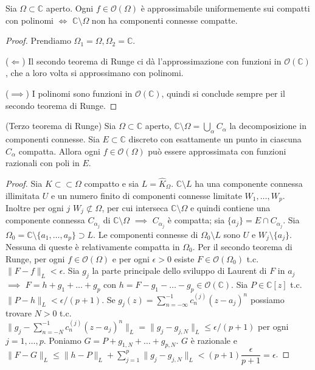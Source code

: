 \begin{cor}
  Sia $\Omega \subset \mathbb{C}$ aperto. Ogni $f \in \mathcal{O}(\Omega)$ è approssimabile uniformemente sui compatti con polinomi $\iff$ $\mathbb{C}\setminus \Omega$ non ha componenti connesse compatte.
\end{cor}

\begin{proof}
  Prendiamo $\Omega_1=\Omega, \Omega_2=\mathbb{C}$.

  ($\Leftarrow$) Il secondo teorema di Runge ci dà l'approssimazione con funzioni in $\mathcal{O}(\mathbb{C})$, che a loro volta si approssimano con polinomi.

  ($\implies$) I polinomi sono funzioni in $\mathcal{O}(\mathbb{C})$, quindi si conclude sempre per il secondo teorema di Runge.
\end{proof}

\begin{thm}
  (Terzo teorema di Runge) Sia $\Omega \subset \mathbb{C}$ aperto, $\displaystyle \mathbb{C}\setminus \Omega=\bigcup_{\alpha}C_{\alpha}$ la decomposizione in componenti connesse. Sia $E \subset \mathbb{C}$ discreto con esattamente un punto in ciascuna $C_{\alpha}$ compatta. Allora ogni $f \in \mathcal{O}(\Omega)$ può essere approssimata con funzioni razionali con poli in $E$.
\end{thm}

\begin{proof}
  Sia $K \subset \subset \Omega$ compatto e sia $L=\widehat{K}_{\Omega}$. $\mathbb{C}\setminus L$ ha una componente connessa illimitata $U$ e un numero finito di componenti connesse limitate $W_1, \dots, W_p$.
  Inoltre per ogni $j$ $W_j \not\subset \Omega$, per cui interseca $\mathbb{C}\setminus\Omega$ e quindi contiene una componente connessa $C_{\alpha_j}$ di $\mathbb{C}\setminus \Omega$ $\implies$ $C_{\alpha_j}$ è compatta; sia $\{a_j\}=E\cap C_{\alpha_j}$.
  Sia $\Omega_0=\mathbb{C}\setminus\{a_1, \dots, a_p\} \supset L$. Le componenti connesse di $\Omega_0 \setminus L$ sono $U$ e $W_j \setminus \{a_j\}$. Nessuna di queste è relativamente compatta in $\Omega_0$.
  Per il secondo teorema di Runge, per ogni $f \in \mathcal{O}(\Omega)$ e per ogni $\epsilon>0$ esiste $F \in \mathcal{O}(\Omega_0)$ t.c. $\|F-f\|_L<\epsilon$. Sia $g_j$ la parte principale dello sviluppo di Laurent di $F$ in $a_j$ $\implies$ $F=h+g_1+\dots+g_p$ con $h=F-g_1-\dots-g_p \in \mathcal{O}(\mathbb{C})$.
  Sia $P \in \mathbb{C}[z]$ t.c. $\|P-h\|_L<\epsilon/(p+1)$. Se $\displaystyle g_j(z)=\sum_{n=-\infty}^{-1} c_n^{(j)}(z-a_j)^n$ possiamo trovare $N>0$ t.c. $\displaystyle \|g_j-\sum_{n=-N}^{-1} c_n^{(j)}(z-a_j)^n\|_L=\|g_j-g_{j,N}\|_L \le \epsilon/(p+1)$ per ogni $j=1, \dots, p$.
  Poniamo $G=P+g_{1,N}+\dots+g_{p,N}$. $G$ è razionale e $\displaystyle \|F-G\|_L \le \|h-P\|_L+\sum_{j=1}^p \|g_j-g_{j,N}\|_L<(p+1) \dfrac{\epsilon}{p+1}=\epsilon$.
\end{proof}
